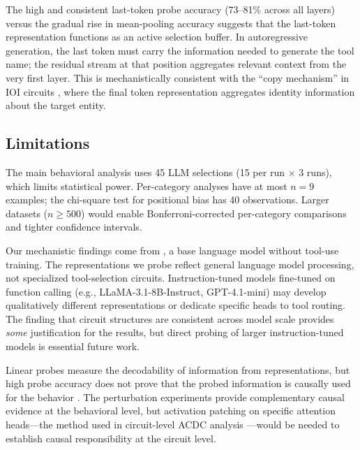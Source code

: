 The high and consistent last-token probe accuracy (73--81\% across all layers) versus the
gradual rise in mean-pooling accuracy suggests that the last-token representation
functions as an active selection buffer.  In autoregressive generation, the last token
must carry the information needed to generate the tool name; the residual stream at that
position aggregates relevant context from the very first layer.  This is mechanistically
consistent with the ``copy mechanism'' in IOI circuits \citep{merullo2024circuit}, where
the final token representation aggregates identity information about the target entity.

\subsection{Limitations}

The main behavioral analysis uses 45 LLM selections (15 per run $\times$ 3 runs), which
limits statistical power.  Per-category analyses have at most $n = 9$ examples;
the chi-square test for positional bias has 40 observations.  Larger datasets ($n \geq
500$) would enable Bonferroni-corrected per-category comparisons and tighter confidence
intervals.

Our mechanistic findings come from \gpttwo, a base language model without tool-use
training.  The representations we probe reflect general language model processing, not
specialized tool-selection circuits.  Instruction-tuned models fine-tuned on function
calling (e.g., LLaMA-3.1-8B-Instruct, GPT-4.1-mini) may develop qualitatively different
representations or dedicate specific heads to tool routing.  The \citet{tigges2024llm}
finding that circuit structures are consistent across model scale provides \emph{some}
justification for the \gpttwo results, but direct probing of larger instruction-tuned
models is essential future work.

Linear probes measure the decodability of information from representations, but high
probe accuracy does not prove that the probed information is causally used for the
behavior \citep{sharkey2025open}.  The perturbation experiments provide complementary
causal evidence at the behavioral level, but activation patching on specific attention
heads---the method used in circuit-level ACDC analysis \citep{conmy2023acdc}---would be
needed to establish causal responsibility at the circuit level.

